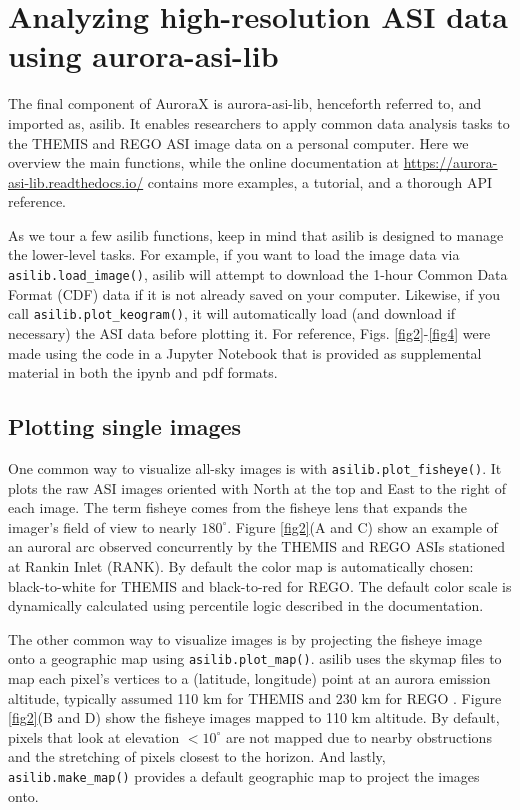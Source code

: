 \documentclass[utf8]{FrontiersinHarvard} %
\begin{document}
\section{Analyzing high-resolution ASI data using aurora-asi-lib}\label{aurora-asi-lib}
The final component of AuroraX is aurora-asi-lib, henceforth referred to, and imported as, asilib. It enables researchers to apply common data analysis tasks to the THEMIS and REGO ASI image data on a personal computer. Here we overview the main functions, while the online documentation at \url{https://aurora-asi-lib.readthedocs.io/} contains more examples, a tutorial, and a thorough API reference.

As we tour a few asilib functions, keep in mind that asilib is designed to manage the lower-level tasks. For example, if you want to load the image data via \verb|asilib.load_image()|, asilib will attempt to download the 1-hour Common Data Format (CDF) data if it is not already saved on your computer. Likewise, if you call \verb|asilib.plot_keogram()|, it will automatically load (and download if necessary) the ASI data before plotting it. For reference, Figs. \ref{fig2}-\ref{fig4} were made using the code in a Jupyter Notebook that is provided as supplemental material in both the ipynb and pdf formats.

\subsection{Plotting single images}
One common way to visualize all-sky images is with \verb|asilib.plot_fisheye()|. It plots the raw ASI images oriented with North at the top and East to the right of each image. The term fisheye comes from the fisheye lens that expands the imager's field of view to nearly $180^\circ$. Figure \ref{fig2}(A and C) show an example of an auroral arc observed concurrently by the THEMIS and REGO ASIs stationed at Rankin Inlet (RANK). By default the color map is automatically chosen: black-to-white for THEMIS and black-to-red for REGO. The default color scale is dynamically calculated using percentile logic described in the documentation.

The other common way to visualize images is by projecting the fisheye image onto a geographic map using \verb|asilib.plot_map()|. asilib uses the skymap files to map each pixel's vertices to a (latitude, longitude) point at an aurora emission altitude, typically assumed 110 km for THEMIS and 230 km for REGO \citep{Donovan2006b, Liang2016}. Figure \ref{fig2}(B and D) show the fisheye images mapped to 110 km altitude. By default, pixels that look at elevation $< 10^\circ$ are not mapped due to nearby obstructions and the stretching of pixels closest to the horizon. And lastly, \verb|asilib.make_map()| provides a default geographic map to project the images onto.
\end{document}
